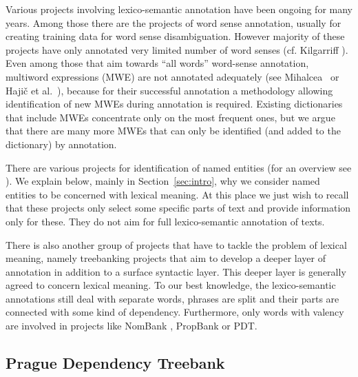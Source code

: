 Various projects involving lexico-semantic annotation have been ongoing for many years. 
Among those there are the projects of word sense annotation, usually for creating training data for word sense disambiguation. However majority of these projects have only annotated very limited number of word senses (cf. Kilgarriff \citeyear{kilgarriff:1998}). Even among those that aim towards ``all words'' word-sense annotation, multiword expressions (MWE) are not annotated adequately (see Mihalcea~\citeyear{mihalcea:1998} or Hajič et al.~\citeyear{hajic-cwn:04}), 
because for their successful annotation a metho\-do\-logy allowing identification of new MWEs during annotation is required. Existing dictionaries that include MWEs concentrate only on the most frequent ones, but we argue that there are many more MWEs that can only be identified (and added to the dictionary) by annotation.

There are various projects for identification of named entities (for an overview see \citealp{sevcikova:2007}). We explain below, mainly in Section~\ref{sec:intro}, why we consider named entities to be concerned with lexical meaning. At this place we just wish to recall that these projects only select some specific parts of text and provide information only for these. They do not aim for full lexico-semantic annotation of texts.

There is also another group of projects that have to tackle the problem of lexical meaning, namely treebanking projects that aim to develop a deeper layer of annotation in addition to a surface syntactic layer. This deeper layer is generally agreed to concern lexical meaning. To our best knowledge, the lexico-semantic annotations still deal with separate words, phrases are split and their parts are connected with some kind of dependency. Furthermore, only words with valency are involved in projects like NomBank \citep{nombank}, PropBank \citep{propbank} or PDT.

\nocite{erbach:1993}

\subsection{Prague Dependency Treebank}

